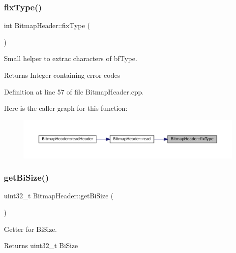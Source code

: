 \subsubsection{\texorpdfstring{fixType()}{fixType()}}
{\footnotesize\ttfamily int Bitmap\+Header\+::fix\+Type (\begin{DoxyParamCaption}{ }\end{DoxyParamCaption})\hspace{0.3cm}{\ttfamily [private]}}



Small helper to extrac characters of bf\+Type. 

\begin{DoxyReturn}{Returns}
Integer containing error codes 
\end{DoxyReturn}


Definition at line 57 of file Bitmap\+Header.\+cpp.

Here is the caller graph for this function\+:
\nopagebreak
\begin{figure}[H]
\begin{center}
\leavevmode
\includegraphics[width=350pt]{classBitmapHeader_aa02e59db95074c6a96a44dac03cee77b_icgraph}
\end{center}
\end{figure}
\mbox{\label{classBitmapHeader_acce4b6292e2aaf5dbd4bc10687c4fb65}} 
\subsubsection{\texorpdfstring{getBiSize()}{getBiSize()}}
{\footnotesize\ttfamily uint32\+\_\+t Bitmap\+Header\+::get\+Bi\+Size (\begin{DoxyParamCaption}{ }\end{DoxyParamCaption})}



Getter for Bi\+Size. 

\begin{DoxyReturn}{Returns}
uint32\+\_\+t Bi\+Size 
\end{DoxyReturn}


